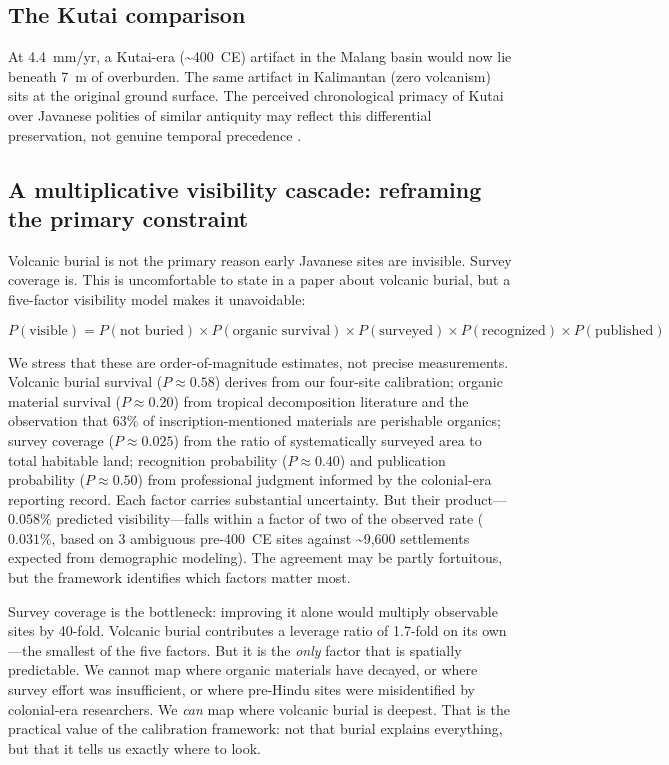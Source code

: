 \documentclass[egqsj, manuscript]{copernicus}
\begin{document}
\subsection{The Kutai comparison}

At 4.4~mm/yr, a Kutai-era (\textasciitilde400~CE) artifact in the Malang basin would now lie beneath 7~m of overburden. The same artifact in Kalimantan (zero volcanism) sits at the original ground surface. The perceived chronological primacy of Kutai over Javanese polities of similar antiquity may reflect this differential preservation, not genuine temporal precedence \citep{coedes1968}.

\subsection{A multiplicative visibility cascade: reframing the primary constraint}

Volcanic burial is not the primary reason early Javanese sites are invisible. Survey coverage is. This is uncomfortable to state in a paper about volcanic burial, but a five-factor visibility model makes it unavoidable:

\begin{equation}
  P(\text{visible}) = P(\text{not buried}) \times P(\text{organic survival}) \times P(\text{surveyed}) \times P(\text{recognized}) \times P(\text{published})
\end{equation}

We stress that these are order-of-magnitude estimates, not precise measurements. Volcanic burial survival ($P \approx 0.58$) derives from our four-site calibration; organic material survival ($P \approx 0.20$) from tropical decomposition literature and the observation that 63\% of inscription-mentioned materials are perishable organics; survey coverage ($P \approx 0.025$) from the ratio of systematically surveyed area to total habitable land; recognition probability ($P \approx 0.40$) and publication probability ($P \approx 0.50$) from professional judgment informed by the colonial-era reporting record. Each factor carries substantial uncertainty. But their product---$0.058\%$ predicted visibility---falls within a factor of two of the observed rate ($0.031\%$, based on 3 ambiguous pre-400~CE sites against \textasciitilde9,600 settlements expected from demographic modeling). The agreement may be partly fortuitous, but the framework identifies which factors matter most.

Survey coverage is the bottleneck: improving it alone would multiply observable sites by 40-fold. Volcanic burial contributes a leverage ratio of 1.7-fold on its own---the smallest of the five factors. But it is the \textit{only} factor that is spatially predictable. We cannot map where organic materials have decayed, or where survey effort was insufficient, or where pre-Hindu sites were misidentified by colonial-era researchers. We \textit{can} map where volcanic burial is deepest. That is the practical value of the calibration framework: not that burial explains everything, but that it tells us exactly where to look.
\end{document}
